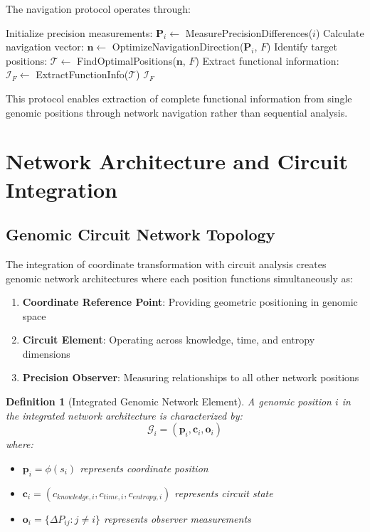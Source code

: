\documentclass[12pt,a4paper]{article}
\newtheorem{definition}{Definition}
\begin{document}
The navigation protocol operates through:

\begin{algorithm}[H]
\caption{Genomic Precision-by-Difference Navigation}
\label{alg:genomic_navigation}
\begin{algorithmic}[1]
    \State Initialize precision measurements: $\mathbf{P}_i \gets$ MeasurePrecisionDifferences($i$)
    \State Calculate navigation vector: $\mathbf{n} \gets$ OptimizeNavigationDirection($\mathbf{P}_i$, $F$)
    \State Identify target positions: $\mathcal{T} \gets$ FindOptimalPositions($\mathbf{n}$, $F$)
    \State Extract functional information: $\mathcal{I}_F \gets$ ExtractFunctionInfo($\mathcal{T}$)
    \State \Return $\mathcal{I}_F$
\EndProcedure
\end{algorithmic}
\end{algorithm}

This protocol enables extraction of complete functional information from single genomic positions through network navigation rather than sequential analysis.

\section{Network Architecture and Circuit Integration}

\subsection{Genomic Circuit Network Topology}

The integration of coordinate transformation with circuit analysis creates genomic network architectures where each position functions simultaneously as:

\begin{enumerate}
\item \textbf{Coordinate Reference Point}: Providing geometric positioning in genomic space
\item \textbf{Circuit Element}: Operating across knowledge, time, and entropy dimensions
\item \textbf{Precision Observer}: Measuring relationships to all other network positions
\end{enumerate}

\begin{definition}[Integrated Genomic Network Element]
A genomic position $i$ in the integrated network architecture is characterized by:
\begin{equation}
\mathcal{G}_i = (\mathbf{p}_i, \mathbf{c}_i, \mathbf{o}_i)
\end{equation}
where:
\begin{itemize}
\item $\mathbf{p}_i = \phi(s_i)$ represents coordinate position
\item $\mathbf{c}_i = (c_{knowledge,i}, c_{time,i}, c_{entropy,i})$ represents circuit state
\item $\mathbf{o}_i = \{\Delta P_{ij} : j \neq i\}$ represents observer measurements
\end{itemize}
\end{definition}
\end{document}

